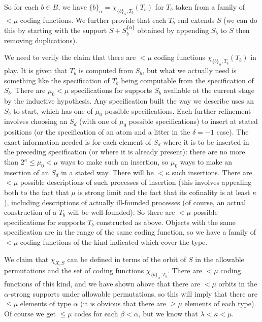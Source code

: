 \documentclass[112pt]{article}
\begin{document}
\begin{description}
So for each $b \in B$, we have $\{b\}_\alpha = \chi_{\{b\}_\alpha,T_b}(T_b)$ for $T_b$ taken from a family of $<\mu$ coding functions.
We further provide that each $T_b$ end extends $S$ (we can do this by starting with the support $S+S_b^{\{\alpha\}}$ obtained by appending $S_b$ to $S$ then removing duplications).

We need to verify the claim that there are $<\mu$ coding functions $\chi_{\{b\}_\alpha,T_b}(T_b)$ in play.  It is given that $T_b$ is computed from
$S_b$, but what we actually need is something like the specification of $T_b$ being computable from the specification of $S_b$.  There are $\mu_0<\mu$ specifications for supports $S_b$ available at the current stage by the inductive hypothesis.   Any specification built the way we describe uses
an $S_b$ to start, which has one of $\mu_0$ possible specifications.  Each further refinement involves choosing an $S_d$ (with one of $\mu_0$ possible specifications) to insert 
at stated positions (or the specification of an atom and a litter in the $\delta=-1$ case).  The exact information needed is for each element of $S_d$ where it is to be inserted in the preceding specification (or where it is already present):  there are no more than $2^\kappa\leq \mu_0<\mu$ ways to make such an insertion, so $\mu_0$ ways to make an insertion of an $S_d$ in a stated way. There will be $<\kappa$ such insertions.
There are $<\mu$ possible descriptions of such processes of insertion (this involves appealing both to the fact that $\mu$ is strong limit and the fact that its cofinality is at least $\kappa$), including descriptions of actually ill-founded processes (of course, an actual construction of a $T_b$ will be well-founded).  So there are $<\mu$ possible specifications for supports $T_b$ constructed as above.   Objects with the same specification are in the range of the same coding function, so we have a family of $<\mu$ coding functions of the kind indicated which cover the type.

We claim that $\chi_{X,S}$ can be defined in terms of the orbit of $S$ in the allowable permutations and the set of coding functions $\chi_{\{b\}_\alpha,T_b}$.  There are $<\mu$ coding functions of this kind, and we have shown above that there are $<\mu$ orbits in the $\alpha$-strong supports under allowable permutations, so this will imply that there are $\leq \mu$ elements of type $\alpha$ (it is obvious that there are $\geq \mu$ elements of each type).
Of course we get $\leq \mu$ codes for each $\beta<\alpha$, but we know that $\lambda<\kappa<\mu$.


\end{description}
\end{document}
